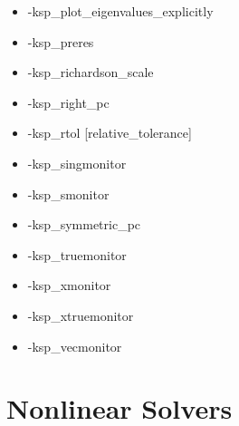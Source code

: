 {\begin{itemize}
\item -ksp\_plot\_eigenvalues\_explicitly
\item -ksp\_preres
\item -ksp\_richardson\_scale
\item -ksp\_right\_pc
\item -ksp\_rtol [relative\_tolerance]
\item -ksp\_singmonitor
\item -ksp\_smonitor
\item -ksp\_symmetric\_pc
\item -ksp\_truemonitor
\item -ksp\_xmonitor
\item -ksp\_xtruemonitor
\item -ksp\_vecmonitor
\end{itemize}


{\footnotesize
\noindent

}

\section{Nonlinear Solvers}

}
